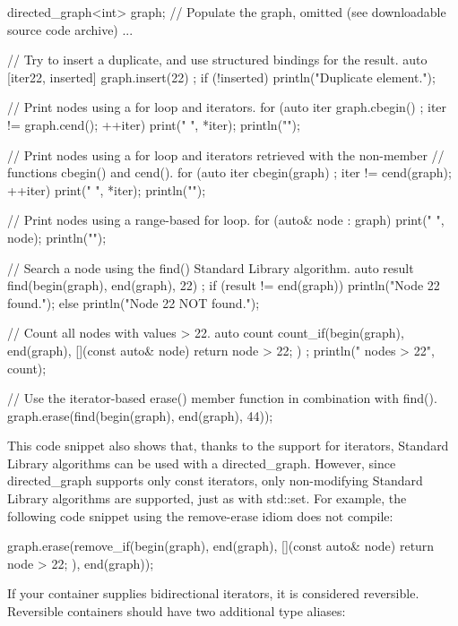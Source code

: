 \begin{cpp}
directed_graph<int> graph;
// Populate the graph, omitted (see downloadable source code archive) ...

// Try to insert a duplicate, and use structured bindings for the result.
auto [iter22, inserted] { graph.insert(22) };
if (!inserted) { println("Duplicate element."); }

// Print nodes using a for loop and iterators.
for (auto iter { graph.cbegin() }; iter != graph.cend(); ++iter) {
    print("{} ", *iter);
}
println("");

// Print nodes using a for loop and iterators retrieved with the non-member
// functions cbegin() and cend().
for (auto iter { cbegin(graph) }; iter != cend(graph); ++iter) {
    print("{} ", *iter);
}
println("");

// Print nodes using a range-based for loop.
for (auto& node : graph) { print("{} ", node); }
println("");

// Search a node using the find() Standard Library algorithm.
auto result { find(begin(graph), end(graph), 22) };
if (result != end(graph)) { println("Node 22 found.");}
else { println("Node 22 NOT found."); }

// Count all nodes with values > 22.
auto count { count_if(begin(graph), end(graph),
    [](const auto& node) { return node > 22; }) };
println("{} nodes > 22", count);

// Use the iterator-based erase() member function in combination with find().
graph.erase(find(begin(graph), end(graph), 44));
\end{cpp}

This code snippet also shows that, thanks to the support for iterators, Standard Library algorithms can be used with a directed\_graph. However, since directed\_graph supports only const iterators, only non-modifying Standard Library algorithms are supported, just as with std::set. For example, the following code snippet using the remove-erase idiom does not compile:

\begin{cpp}
graph.erase(remove_if(begin(graph), end(graph),
    [](const auto& node) { return node > 22; }), end(graph));
\end{cpp}


If your container supplies bidirectional iterators, it is considered reversible. Reversible containers should have two additional type aliases:

